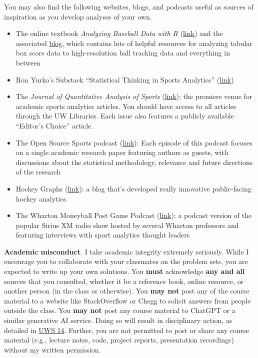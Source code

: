 \documentclass[11pt]{article}
\begin{document}
You may also find the following websites, blogs, and podcasts useful as sources of inspiration as you develop analyses of your own.

\begin{itemize}
\item{The online textbook \textit{Analyzing Baseball Data with R} (\href{https://beanumber.github.io/abdwr3e/}{link}) and the associated \href{https://baseballwithr.wordpress.com}{blog}, which contains lots of helpful resources for analyzing tabular box score data to high-resolution ball tracking data and everything in between}
\item{Ron Yurko's Substack ``Statistical Thinking in Sports Analytics'' (\href{https://statthinksportsanalytics.substack.com}{link})}
\item{The \textit{Journal of Quantitative Analysis of Sports} (\href{https://www.degruyter.com/journal/key/jqas/html?lang=en&srsltid=AfmBOoqvNglsW_tIa2IHQ4uaPHDGblGz1zYkSjhFjVazKZUzFFg3mnhp}{link}): the premiere venue for academic sports analytics articles. You should have access to all articles through the UW Libraries. Each issue also features a publicly available ``Editor's Choice'' article.}
\item{The Open Source Sports podcast (\href{https://open.spotify.com/show/3vTtH2JJXbjrzOtEfjrqc4}{link}): Each episode of this podcast focuses on a single academic research paper featuring authors as guests, with discussions about the statistical methodology, relevance and future directions of the research}
\item{Hockey Graphs (\href{https://hockey-graphs.com}{link}): a blog that's developed really innovative public-facing hockey analytics}
\item{The Wharton Moneyball Post Game Podcast (\href{https://knowledge.wharton.upenn.edu/shows/moneyball-highlights/}{link}): a podcast version of the popular Sirius XM radio show hosted by several Wharton professors and featuring interviews with sport analytics thought leaders}
\end{itemize}


\textbf{Academic misconduct}. I take academic integrity extremely seriously. While I encourage you to collaborate with your classmates on the problem sets, you are expected to write up your own solutions. 
You \textbf{must} acknowledge \textbf{any and all} sources that you consulted, whether it be a reference book, online resource, or another person (in the class or otherwise). 
You \textbf{may not} post any of the course material to a website like StackOverflow or Chegg to solicit answers from people outside the class. 
You \textbf{may not} post any course material to ChatGPT or a similar generative AI service. 
Doing so will result in disciplinary action, as detailed in \href{https://docs.legis.wisconsin.gov/code/admin_code/uws/14}{UWS 14}. 
Further, you are not permitted to post or share any course material (e.g., lecture notes, code, project reports, presentation recordings) without my written permission.
\end{document}
